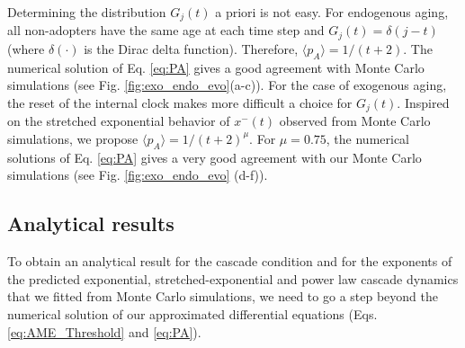 Determining the distribution $G_j (t)$ a priori is not easy. For endogenous aging, all non-adopters have the same age at each time step and $G_j (t) = \delta(j-t)$ (where $\delta(\cdot)$ is the Dirac delta function). Therefore, $\langle p_A \rangle = 1/(t+2)$. The numerical solution of Eq. \eqref{eq:PA} gives a good agreement with Monte Carlo simulations (see Fig. \ref{fig:exo_endo_evo}(a-c)). For the case of exogenous aging, the reset of the internal clock makes more difficult a choice for $G_j (t)$.  Inspired on the stretched exponential behavior of $x^{-}(t)$ observed from Monte Carlo simulations, we propose $\langle p_A \rangle = 1/(t+2)^\mu$. For $\mu = 0.75$, the numerical solutions of Eq. \eqref{eq:PA} gives a very good agreement with our Monte Carlo simulations (see Fig. \ref{fig:exo_endo_evo} (d-f)).

\subsection{\label{subsec Analytical results} Analytical results}


To obtain an analytical result for the cascade condition and for the exponents of the predicted exponential, stretched-exponential and power law cascade dynamics that we fitted from Monte Carlo simulations, we need to go a step beyond the numerical solution of our approximated differential equations (Eqs. \eqref{eq:AME_Threshold} and \eqref{eq:PA}). 

